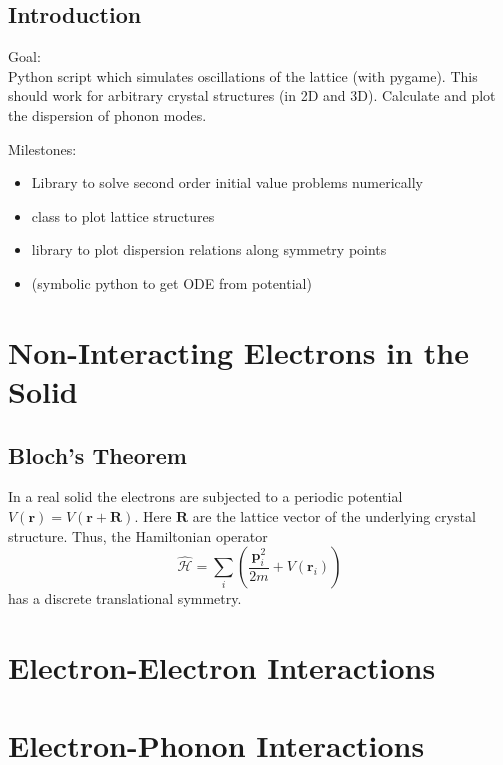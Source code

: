 \documentclass[11pt]{book}
\renewcommand{\vec}[1]{\bm{#1}}
\renewcommand{\H}{\hat{\mathcal{H}}}
\begin{document}
\section{Introduction}

Goal:\\ 
Python script which simulates oscillations of the lattice (with pygame). This should work for arbitrary crystal structures (in 2D and 3D). Calculate and plot the dispersion of phonon modes.

Milestones:
\begin{itemize}
  \item Library to solve second order initial value problems numerically
  \item class to plot lattice structures
  \item library to plot dispersion relations along symmetry points
  \item (symbolic python to get ODE from potential)
\end{itemize}

\chapter{Non-Interacting Electrons in the Solid}

\section{Bloch's Theorem}\label{section4.1}
In a real solid the electrons are subjected to a periodic potential $V(\vec{r}) = V(\vec{r} + \vec{R})$. Here $\vec{R}$ are the lattice vector of the underlying crystal structure. Thus, the Hamiltonian operator 
\begin{equation}
  \H = \sum_{i} \left(\frac{\vec{p}^2_i}{2m} + V(\vec{r}_i) \right)
\end{equation}
has a discrete translational symmetry. 
\clearpage
\newpage


\chapter{Electron-Electron Interactions}\label{chapter5}

\chapter{Electron-Phonon Interactions}\label{chapter4}
\end{document}
